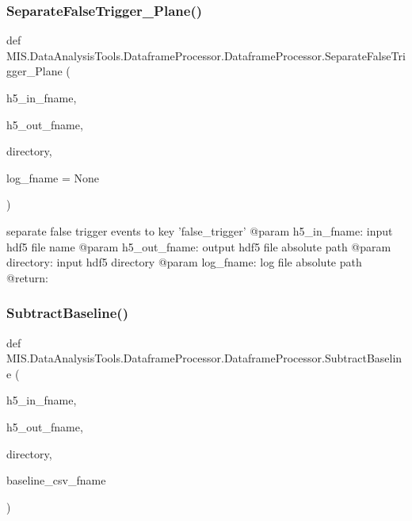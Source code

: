 \subsubsection{\texorpdfstring{Separate\+False\+Trigger\+\_\+\+Plane()}{SeparateFalseTrigger\_Plane()}}
{\footnotesize\ttfamily def M\+I\+S.\+Data\+Analysis\+Tools.\+Dataframe\+Processor.\+Dataframe\+Processor.\+Separate\+False\+Trigger\+\_\+\+Plane (\begin{DoxyParamCaption}\item[{}]{h5\+\_\+in\+\_\+fname,  }\item[{}]{h5\+\_\+out\+\_\+fname,  }\item[{}]{directory,  }\item[{}]{log\+\_\+fname = {\ttfamily None} }\end{DoxyParamCaption})\hspace{0.3cm}{\ttfamily [static]}}

\begin{DoxyVerb}separate false trigger events to key 'false_trigger'
@param h5_in_fname: input hdf5 file name
@param h5_out_fname: output hdf5 file absolute path
@param directory: input hdf5 directory
@param log_fname: log file absolute path
@return:
\end{DoxyVerb}
 \mbox{\label{classMIS_1_1DataAnalysisTools_1_1DataframeProcessor_1_1DataframeProcessor_a23c1697cec9f125c598fab306c910924}} 
\subsubsection{\texorpdfstring{Subtract\+Baseline()}{SubtractBaseline()}}
{\footnotesize\ttfamily def M\+I\+S.\+Data\+Analysis\+Tools.\+Dataframe\+Processor.\+Dataframe\+Processor.\+Subtract\+Baseline (\begin{DoxyParamCaption}\item[{}]{h5\+\_\+in\+\_\+fname,  }\item[{}]{h5\+\_\+out\+\_\+fname,  }\item[{}]{directory,  }\item[{}]{baseline\+\_\+csv\+\_\+fname }\end{DoxyParamCaption})\hspace{0.3cm}{\ttfamily [static]}}


